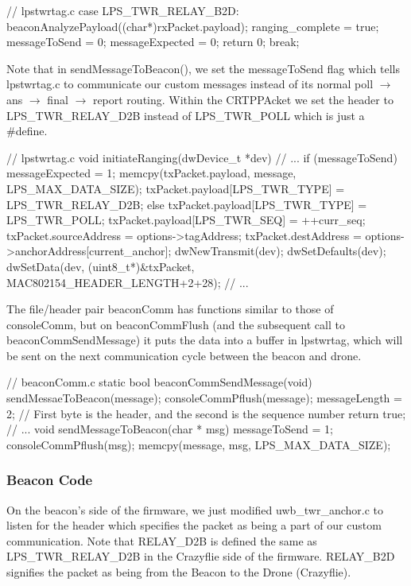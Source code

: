 \documentclass[]{article}
\begin{document}
\begin{C}
// lpstwrtag.c
case LPS_TWR_RELAY_B2D:
{
	beaconAnalyzePayload((char*)rxPacket.payload);
	ranging_complete = true;
	messageToSend = 0;
	messageExpected = 0;
	return 0;
	break;
}
\end{C}

Note that in sendMessageToBeacon(), we set the  messageToSend flag which tells lpstwrtag.c to communicate our custom messages instead of its normal poll $\rightarrow$ ans $\rightarrow$ final $\rightarrow$ report routing. Within the CRTPPAcket we set the header to LPS\_TWR\_RELAY\_D2B instead of LPS\_TWR\_POLL which is just a \#define.

\begin{C}
// lpstwrtag.c
void initiateRanging(dwDevice_t *dev) {
//	...
	if (messageToSend) {
		messageExpected = 1;
		memcpy(txPacket.payload, message, LPS_MAX_DATA_SIZE);
		txPacket.payload[LPS_TWR_TYPE] = LPS_TWR_RELAY_D2B;
	}
	else {
		txPacket.payload[LPS_TWR_TYPE] = LPS_TWR_POLL;
	}
	txPacket.payload[LPS_TWR_SEQ] = ++curr_seq;
	txPacket.sourceAddress = options->tagAddress;
	txPacket.destAddress = options->anchorAddress[current_anchor];
	dwNewTransmit(dev);
	dwSetDefaults(dev);
	dwSetData(dev, (uint8_t*)&txPacket, MAC802154_HEADER_LENGTH+2+28);
//	...
}
\end{C}

The file/header pair beaconComm has functions similar to those of consoleComm, but on beaconCommFlush (and the subsequent call to  beaconCommSendMessage) it puts the data into a buffer in lpstwrtag, which will be sent on the next communication cycle between the beacon and drone.

\begin{C}
// beaconComm.c
static bool beaconCommSendMessage(void) {
	sendMessaeToBeacon(message);
	consoleCommPflush(message);
	messageLength = 2;
	// First byte is the header, and the second is the sequence number
	return true;
}
//	...
void sendMessageToBeacon(char * msg) {
	messageToSend = 1;
	consoleCommPflush(msg);
	memcpy(message, msg, LPS_MAX_DATA_SIZE);
}
\end{C}

\subsubsection{Beacon Code}

On the beacon's side of the firmware, we just modified uwb\_twr\_anchor.c to listen for the header which specifies the packet as being a part of our custom communication. Note that RELAY\_D2B is defined the same as LPS\_TWR\_RELAY\_D2B in the Crazyflie side of the firmware. RELAY\_B2D signifies the packet as being from the Beacon to the Drone (Crazyflie).
\end{document}
